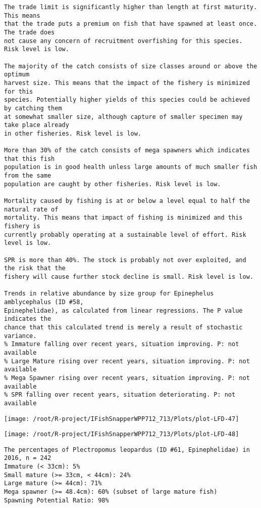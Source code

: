 \documentclass{report}\usepackage[]{graphicx}\usepackage[]{color}
\makeatletter
\def\maxwidth{ %
  \ifdim\Gin@nat@width>\linewidth
    \linewidth
  \else
    \Gin@nat@width
  \fi
}
\newenvironment{kframe}{%
 \def\at@end@of@kframe{}%
 \ifinner\ifhmode%
  \def\at@end@of@kframe{\end{minipage}}%
  \begin{minipage}{\columnwidth}%
 \fi\fi%
 \def\FrameCommand##1{\hskip\@totalleftmargin \hskip-\fboxsep
 \colorbox{shadecolor}{##1}\hskip-\fboxsep
     \hskip-\linewidth \hskip-\@totalleftmargin \hskip\columnwidth}%
 \MakeFramed {\advance\hsize-\width
   \@totalleftmargin\z@ \linewidth\hsize
   \@setminipage}}%
 {\par\unskip\endMakeFramed%
 \at@end@of@kframe}
\newenvironment{knitrout}{}{} %
\makeatother
\begin{document}
\begin{knitrout}
\begin{kframe}
\begin{verbatim}
The trade limit is significantly higher than length at first maturity.  This means
that the trade puts a premium on fish that have spawned at least once. The trade does
not cause any concern of recruitment overfishing for this species. Risk level is low.

The majority of the catch consists of size classes around or above the optimum
harvest size. This means that the impact of the fishery is minimized for this
species. Potentially higher yields of this species could be achieved by catching them
at somewhat smaller size, although capture of smaller specimen may take place already
in other fisheries. Risk level is low.

More than 30% of the catch consists of mega spawners which indicates that this fish
population is in good health unless large amounts of much smaller fish from the same
population are caught by other fisheries. Risk level is low.
 
Mortality caused by fishing is at or below a level equal to half the natural rate of
mortality. This means that impact of fishing is minimized and this fishery is
currently probably operating at a sustainable level of effort. Risk level is low.
 
SPR is more than 40%. The stock is probably not over exploited, and the risk that the
fishery will cause further stock decline is small. Risk level is low.
 
Trends in relative abundance by size group for Epinephelus amblycephalus (ID #58,
Epinephelidae), as calculated from linear regressions. The P value indicates the
chance that this calculated trend is merely a result of stochastic variance.
% Immature falling over recent years, situation improving. P: not available
% Large Mature rising over recent years, situation improving. P: not available
% Mega Spawner rising over recent years, situation improving. P: not available
% SPR falling over recent years, situation deteriorating. P: not available
\end{verbatim}
\end{kframe}
\texttt{[image: /root/R-project/IFishSnapperWPP712\_713/Plots/plot-LFD-47]} 

\texttt{[image: /root/R-project/IFishSnapperWPP712\_713/Plots/plot-LFD-48]} 
\begin{kframe}\begin{verbatim}
The percentages of Plectropomus leopardus (ID #61, Epinephelidae) in 2016, n = 242
Immature (< 33cm): 5%
Small mature (>= 33cm, < 44cm): 24%
Large mature (>= 44cm): 71%
Mega spawner (>= 48.4cm): 60% (subset of large mature fish)
Spawning Potential Ratio: 98%
 

\end{verbatim}
\end{kframe}
\end{knitrout}
\end{document}
